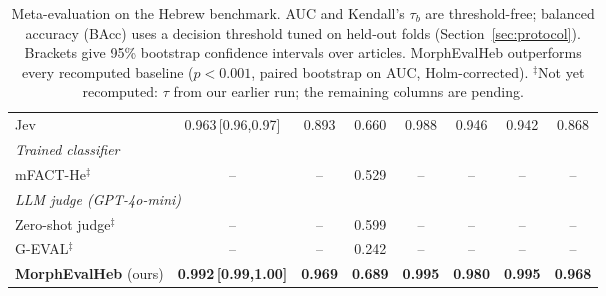 \begin{table}[t]
\begin{tabular}{lccc|cc|cc}
Jev & 0.963\,{\scriptsize[0.96,0.97]} & 0.893 & 0.660 & 0.988 & 0.946 & 0.942 & 0.868 \\
\multicolumn{8}{l}{\textit{Trained classifier}} \\
mFACT-He$^{\ddagger}$ & -- & -- & 0.529 & -- & -- & -- & -- \\
\multicolumn{8}{l}{\textit{LLM judge (GPT-4o-mini)}} \\
Zero-shot judge$^{\ddagger}$ & -- & -- & 0.599 & -- & -- & -- & -- \\
G-EVAL$^{\ddagger}$ & -- & -- & 0.242 & -- & -- & -- & -- \\
\midrule
\textbf{MorphEvalHeb} (ours) & \textbf{0.992\,{\scriptsize[0.99,1.00]}} & \textbf{0.969} & \textbf{0.689} & \textbf{0.995} & \textbf{0.980} & \textbf{0.995} & \textbf{0.968} \\
\bottomrule
\end{tabular}
\caption{Meta-evaluation on the Hebrew benchmark. AUC and Kendall's $\tau_b$ are threshold-free; balanced accuracy (BAcc) uses a decision threshold tuned on held-out folds (Section~\ref{sec:protocol}). Brackets give 95\% bootstrap confidence intervals over articles. MorphEvalHeb outperforms every recomputed baseline ($p<0.001$, paired bootstrap on AUC, Holm-corrected). $^{\ddagger}$Not yet recomputed: $\tau$ from our earlier run; the remaining columns are pending.}
\label{tab:main_results}
\end{table}
